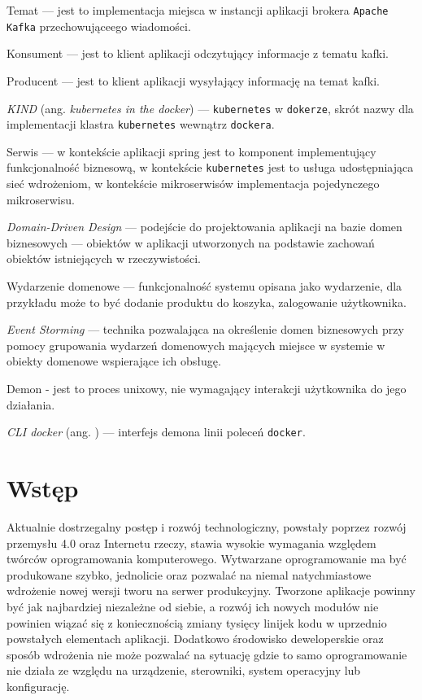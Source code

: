 \documentclass[12pt,twoside]{article}
\begin{document}
Temat — jest to implementacja miejsca w instancji aplikacji brokera \texttt{Apache Kafka} przechowująceego wiadomości.

Konsument — jest to klient aplikacji odczytujący informacje z tematu kafki.

Producent — jest to klient aplikacji wysyłający informację na temat kafki.

\textit{KIND} (ang. \textit{kubernetes in the docker}) — \texttt{kubernetes} w \texttt{dokerze}, skrót nazwy dla implementacji klastra \texttt{kubernetes} wewnątrz \texttt{dockera}.

Serwis — w kontekście aplikacji spring jest to komponent implementujący funkcjonalność biznesową, w kontekście \texttt{kubernetes} jest to usługa udostępniająca sieć wdrożeniom, w kontekście mikroserwisów implementacja pojedynczego mikroserwisu.

\textit{Domain-Driven Design} — podejście do projektowania aplikacji na bazie domen biznesowych — obiektów w aplikacji utworzonych na podstawie zachowań obiektów istniejących w rzeczywistości.

Wydarzenie domenowe — funkcjonalność systemu opisana jako wydarzenie, dla przykładu może to być dodanie produktu do koszyka, zalogowanie użytkownika.

\textit{Event Storming} — technika pozwalająca na określenie domen biznesowych przy pomocy grupowania wydarzeń domenowych mających miejsce w systemie w obiekty domenowe wspierające ich obsługę.

Demon - jest to proces unixowy, nie wymagający interakcji użytkownika do jego działania.

\textit{CLI docker} (ang. ) — interfejs demona linii poleceń \texttt{docker}.

\clearpage

\section{Wstęp}

Aktualnie dostrzegalny postęp i rozwój technologiczny, powstały poprzez rozwój przemysłu 4.0 oraz Internetu rzeczy, stawia wysokie wymagania względem twórców oprogramowania komputerowego.
Wytwarzane oprogramowanie ma być produkowane szybko, jednolicie oraz pozwalać na niemal natychmiastowe wdrożenie nowej wersji tworu na serwer produkcyjny. Tworzone aplikacje powinny być jak najbardziej niezależne od siebie, a rozwój ich nowych modułów nie powinien wiązać się z koniecznością zmiany tysięcy linijek kodu w uprzednio powstałych elementach aplikacji. Dodatkowo środowisko deweloperskie oraz sposób wdrożenia nie może pozwalać na sytuację gdzie to samo oprogramowanie nie działa ze względu na urządzenie, sterowniki, system operacyjny lub konfigurację.
\end{document}
